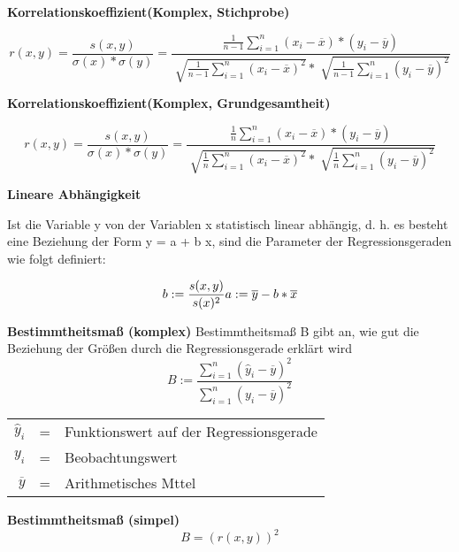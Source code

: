 \documentclass[11pt,twocolumn,fleqn]{article}
\begin{document}
\textbf{Korrelationskoeffizient(Komplex, Stichprobe)}

  \begin{equation*}
  r(x,y)= \frac{s(x,y)}{\sigma(x)*\sigma(y)} = \frac{ \frac{1}{n-1}\sum^n_{i=1}(x_i-\overline{x})*(y_i-\overline{y}) }{ \sqrt[]{ \frac{1}{n-1}\sum^n_{i=1}(x_i - \overline{x})^2 } * \sqrt[]{ \frac{1}{n-1}\sum^n_{i=1}(y_i - \overline{y})^2 } }
  \end{equation*}
  
\textbf{Korrelationskoeffizient(Komplex, Grundgesamtheit)}

  \begin{equation*}
  r(x,y)= \frac{s(x,y)}{\sigma(x)*\sigma(y)} = \frac{ \frac{1}{n}\sum^n_{i=1}(x_i-\overline{x})*(y_i-\overline{y}) }{ \sqrt[]{ \frac{1}{n}\sum^n_{i=1}(x_i - \overline{x})^2 } * \sqrt[]{ \frac{1}{n}\sum^n_{i=1}(y_i - \overline{y})^2 } }
  \end{equation*}  

\textbf{Lineare Abhängigkeit}

Ist die Variable y von der Variablen x statistisch linear abhängig, d. h. es besteht eine Beziehung der Form y = a + b x, sind die Parameter der Regressionsgeraden wie folgt definiert: 

\begin{equation*}
b:=\frac{s(x,y)}{s(x)^2}\\
a:=\overline{y}-b*\overline{x}
\end{equation*}

\textbf{Bestimmtheitsmaß (komplex)}
Bestimmtheitsmaß B gibt an, wie gut die Beziehung der Größen durch die Regressionsgerade erklärt wird
\begin{equation*}
B:=\frac{ \sum^n_{i=1}(\widehat{y}_i-\overline{y})^2 }{ \sum^n_{i=1}(y_i-\overline{y})^2 }
\end{equation*}
\begin{center}\begin{tabular}{rcl}
   $\widehat{y}_i$ & = & Funktionswert auf der Regressionsgerade \\
   $y_i$ & = & Beobachtungswert \\
   $\overline{y}$ & = & Arithmetisches Mttel \\
\end{tabular}\end{center}

\textbf{Bestimmtheitsmaß (simpel)}
\begin{equation*}
B=(r(x,y))^2
\end{equation*}
\end{document}
